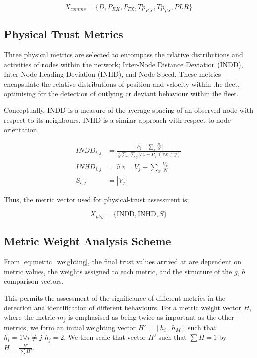 \documentclass{aamas2016}
\begin{document}
\begin{equation}
	X_{comms}=\{D, P_{RX}, P_{TX}, Tp_{RX}, Tp_{TX}, PLR\}
	\label{eq:comms_vector}
\end{equation}

\subsection{Physical Trust Metrics}

Three physical metrics are selected to encompass the relative distributions and activities of nodes within the network; Inter-Node Distance Deviation (INDD), Inter-Node Heading Deviation (INHD), and Node Speed. These metrics encapsulate the relative distributions of position and velocity within the fleet, optimising for the detection of outlying or deviant behaviour within the fleet.

Conceptually, INDD is a measure of the average spacing of an observed node with respect to its neighbours. INHD is a similar approach with respect to node orientation.

\begin{align}
	INDD_{i,j} &= \frac{|P_j - \sum_x \frac{P_x}{N}|}{\frac{1}{N}\sum_x \sum_y{|P_x - P_y| (\forall x \neq y)}}\\
	INHD_{i,j} &= \hat{v} \vert v= V_j - \sum_x{\frac{V_x}{N}}\\
	S_{i,j} &= |V_j|
\end{align}

Thus, the metric vector used for physical-trust assessment is;

\begin{equation}
  X_{phy}=\{\text{INDD}, \text{INHD}, S\}
	\label{eq:phys:vector}
\end{equation}

\subsection{Metric Weight Analysis Scheme}

From \eqref{eq:metric_weighting}, the final trust values arrived at are dependent on metric values, the weights assigned to each metric, and the structure of the $g$, $b$ comparison vectors.

This permits the assessment of the significance of different metrics in the detection and identification of different behaviours. 
For a metric weight vector $H$, where the metric $m_j$ is emphasised as being twice as important as the other metrics, we form an initial weighting vector $H'=[h_i...h_M]$ such that $h_i = 1 \forall i \ne j; h_j=2$. We then scale that vector $H'$ such that $\sum H = 1$ by $H= \frac{H'}{\sum H'}$.
\end{document}
